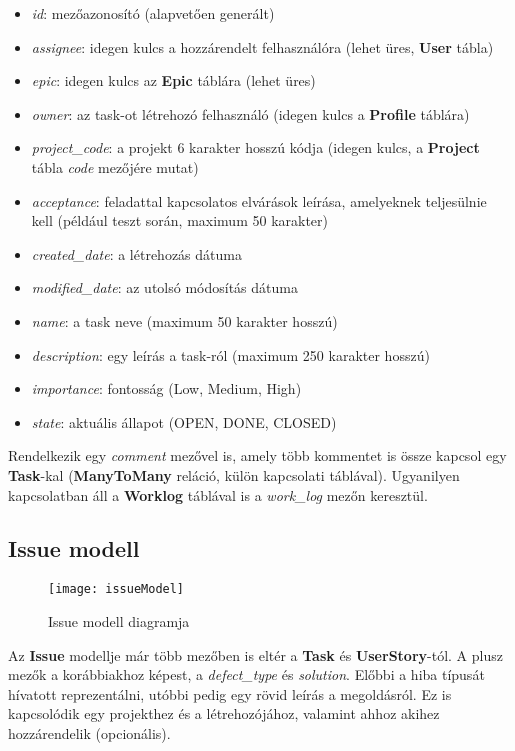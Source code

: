 \begin{itemize}
	\item \textit{id}: mezőazonosító (alapvetően generált)
	\item \textit{assignee}: idegen kulcs a hozzárendelt felhasználóra (lehet üres, \textbf{User} tábla)
	\item \textit{epic}: idegen kulcs az \textbf{Epic} táblára (lehet üres)
	\item \textit{owner}: az task-ot létrehozó felhasználó (idegen kulcs a \textbf{Profile} táblára)
	\item \textit{project\_code}: a projekt 6 karakter hosszú kódja (idegen kulcs, a \textbf{Project} tábla \textit{code} mezőjére mutat)
	\item \textit{acceptance}: feladattal kapcsolatos elvárások leírása, amelyeknek teljesülnie kell (például teszt során, maximum 50 karakter)
	\item \textit{created\_date}: a létrehozás dátuma
	\item \textit{modified\_date}: az utolsó módosítás dátuma
	\item \textit{name}: a task neve (maximum 50 karakter hosszú)
	\item \textit{description}: egy leírás a task-ról (maximum 250 karakter hosszú)
	\item \textit{importance}: fontosság (Low, Medium, High)
	\item \textit{state}: aktuális állapot (OPEN, DONE, CLOSED)
\end{itemize}

Rendelkezik egy \textit{comment} mezővel is, amely több kommentet is össze kapcsol egy \textbf{Task}-kal (\textbf{ManyToMany} reláció, külön kapcsolati táblával). Ugyanilyen kapcsolatban áll a \textbf{Worklog} táblával is a \textit{work\_log} mezőn keresztül.

\subsection{Issue modell}

\begin{figure}[H]
	\centering
	\texttt{[image: issueModel]}
	\caption{Issue modell diagramja}
	\label{fig:issuemodel}
\end{figure}

Az \textbf{Issue} modellje már több mezőben is eltér a \textbf{Task} és \textbf{UserStory}-tól. A plusz mezők a korábbiakhoz képest, a \textit{defect\_type} és \textit{solution}. Előbbi a hiba típusát hívatott reprezentálni, utóbbi pedig egy rövid leírás a megoldásról. Ez is kapcsolódik egy projekthez és a létrehozójához, valamint ahhoz akihez hozzárendelik (opcionális).

